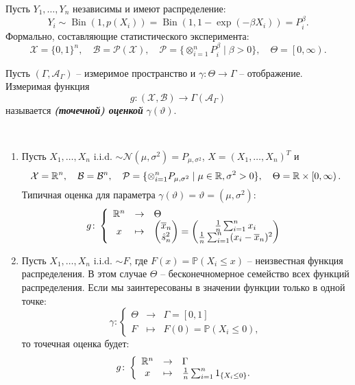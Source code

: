 \begin{exmp}
	Пусть $Y_1, \dots, Y_n$ независимы и имеют распределение:
	\[Y_i \sim \operatorname{Bin}(1, p(X_i))=\operatorname{Bin}(1, 1-\exp(-\beta X_i))=P_i^{\beta}.\]
	Формально, составляющие статистического эксперимента:
	\[ \mathcal{X}=\{ 0, 1 \}^n, \quad \mathcal{B}=\mathcal{P(X)}, \quad \mathcal{P}=\{\otimes_{i=1}^nP_i^{\beta} \mid \beta>0 \}, \quad \Theta=\left[0, \infty\right).  \]
\end{exmp}

\begin{defn}
	Пусть $(\Gamma, \mathcal{A}_\Gamma)$ -- измеримое пространство и $\gamma\colon \Theta \rightarrow \Gamma$ -- отображение. Измеримая функция
	\[g\colon(\mathcal{X}, \mathcal{B}) \rightarrow \Gamma(\mathcal{A}_\Gamma)  \]
	называется \textbf{\textit{(точечной) оценкой}} $\gamma(\vartheta)$.
\end{defn}

\begin{exmp} \label{exmp2.7}\
	
	\begin{enumerate}
		\item Пусть $X_1, \dots , X_n$ i.i.d. $\sim \mathcal{N}(\mu, \sigma^2)=P_{\mu, \sigma^2}$, $X=(X_1, \dots , X_n)^T$ и
		\[\mathcal{X}=\mathbb{R}^n, \quad \mathcal{B}=\mathcal{B}^n, \quad \mathcal{P}=\{\otimes_{i=1}^nP_{\mu, \sigma^2} \mid \mu \in \mathbb{R}, \sigma^2>0 \}, \quad \Theta=\mathbb{R} \times \left[0, \infty\right).\]
		Типичная оценка для параметра $\gamma(\vartheta)=\vartheta=(\mu, \sigma^2)$:
		\[ g \colon
		\left \{
		\begin{array}{ccl}
		\mathbb{R}^n & \rightarrow & \Theta \\
		x & \mapsto &\begin{pmatrix} \overline{x}_n \\ \hat{s}_n^2 \end{pmatrix} = \begin{pmatrix} \frac{1}{n} \sum_{i=1}^n x_i \\ \frac{1}{n} \sum_{i=1}^n (x_i-\overline{x}_n)^2 \end{pmatrix}
		\end{array}
		\right.
		\]
		\item Пусть $X_1, \dots , X_n$ i.i.d. $\sim F$, где $F(x)=\mathbb{P}(X_i \leq x)$ -- неизвестная функция распределения. В этом случае $\Theta$ -- бесконечномерное семейство всех функций распределения. Если мы заинтересованы в значении функции только в одной точке:
		\[ \gamma \colon
		\left \{
		\begin{array}{ccl}
		\Theta & \rightarrow & \Gamma=\left[0,1\right] \\
		F & \mapsto & F(0)=\mathbb{P}(X_i \leq 0),
		\end{array}
		\right.
		\]
		то точечная оценка будет:
		\[ g \colon
		\left \{
		\begin{array}{ccl}
		\mathbb{R}^n & \rightarrow & \Gamma \\
		x & \mapsto & \frac{1}{n} \sum_{i=1}^n 1_{\{X_i \leq 0\}}.
		\end{array}
		\right.
		\]
	\end{enumerate}
\end{exmp}

